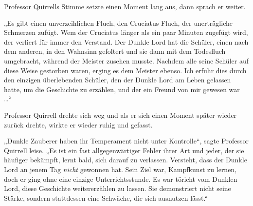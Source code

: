 Professor Quirrells Stimme setzte einen Moment lang aus, dann sprach er weiter.

„Es gibt einen unverzeihlichen Fluch, den Cruciatus-Fluch, der unerträgliche Schmerzen zufügt. Wem der Cruciatus länger als ein paar Minuten zugefügt wird, der verliert für immer den Verstand. Der Dunkle Lord hat die Schüler, einen nach dem anderen, in den Wahnsinn gefoltert und sie dann mit dem Todesfluch umgebracht, während der Meister zusehen musste. Nachdem alle seine Schüler auf diese Weise gestorben waren, erging es dem Meister ebenso. Ich erfuhr dies durch den einzigen überlebenden Schüler, den der Dunkle Lord am Leben gelassen hatte, um die Geschichte zu erzählen, und der ein Freund von mir gewesen war …“

Professor Quirrell drehte sich weg und als er sich einen Moment später wieder zurück drehte, wirkte er wieder ruhig und gefasst.

„Dunkle Zauberer haben ihr Temperament nicht unter Kontrolle“, sagte Professor Quirrell leise. „Es ist ein fast allgegenwärtiger Fehler ihrer Art und jeder, der sie häufiger bekämpft, lernt bald, sich darauf zu verlassen. Versteht, dass der Dunkle Lord an jenem Tag \emph{nicht} gewonnen hat. Sein Ziel war, Kampfkunst zu lernen, doch er ging ohne eine einzige Unterrichtsstunde. Es war töricht vom Dunklen Lord, diese Geschichte weitererzählen zu lassen. Sie demonstriert nicht seine Stärke, sondern stattdessen eine Schwäche, die sich ausnutzen lässt.“

